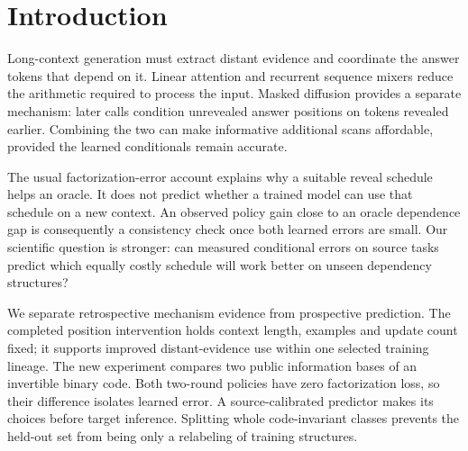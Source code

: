 \begin{abstract}
Linear-cost recurrent denoisers make repeated scans of long contexts affordable,
but useful refinement also requires accurate conditional predictions.
We use established learning/factorization-error accounting to distinguish these
requirements and study a 455M-parameter bidirectional RWKV denoiser on exactly
enumerable binary posterior tasks. A completed within-lineage intervention
shows that balancing evidence positions during fixed-length training reduces
far-context conditional error by 6.051 nats, with a conditional 95\% interval
$[5.392,6.735]$. This result motivates a stronger prospective test: can
source-calibrated errors select a reveal schedule on unseen dependency classes?
The frozen experiment trains six fresh task-training lineages and compares
policies with identical scan count and zero discarded dependence, sealing their
predicted rankings before held-out evaluation. \emph{Revision status: the new
experiment is running; no transfer outcome or independent-lineage success is
claimed in this working draft.} The earlier implementation-specific cost
certificate remains supporting evidence, rather than an optimized deployment
frontier.
\end{abstract}

\section{Introduction}
Long-context generation must extract distant evidence and coordinate the answer
tokens that depend on it. Linear attention and recurrent sequence mixers reduce
the arithmetic required to process the input. Masked diffusion provides a
separate mechanism: later calls condition unrevealed answer positions on tokens
revealed earlier. Combining the two can make informative additional scans
affordable, provided the learned conditionals remain accurate.

The usual factorization-error account explains why a suitable reveal schedule
helps an oracle. It does not predict whether a trained model can use that
schedule on a new context. An observed policy gain close to an oracle dependence
gap is consequently a consistency check once both learned errors are small.
Our scientific question is stronger: can measured conditional errors on source
tasks predict which equally costly schedule will work better on unseen
dependency structures?

We separate retrospective mechanism evidence from prospective prediction.
The completed position intervention holds context length, examples and update
count fixed; it supports improved distant-evidence use within one selected
training lineage. The new experiment compares two public information bases of
an invertible binary code. Both two-round policies have zero factorization loss,
so their difference isolates learned error. A source-calibrated predictor makes
its choices before target inference. Splitting whole code-invariant classes
prevents the held-out set from being only a relabeling of training structures.

